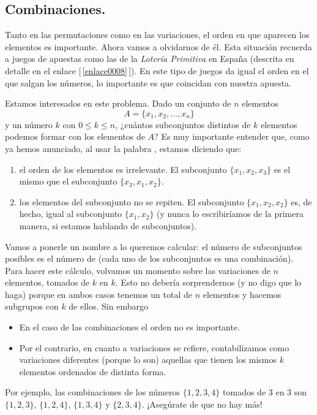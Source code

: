 \subsection{Combinaciones.}
\label{cap03:subsec:Combinaciones}

Tanto en las permutaciones como en las variaciones, el orden en que aparecen los elementos es
importante. Ahora vamos a olvidarnos de \'el. Esta situación recuerda a juegos de apuestas como las de la
{\em Loter\'ia Primitiva} en España (descrita en detalle en el enlace [\,\ref{enlace0008}\,]\label{enlace0008a}). En este tipo de juegos da igual el orden en el que salgan los n\'umeros, lo importante es que coincidan con nuestra apuesta.
	
Estamos interesados en este problema. Dado un conjunto de $n$ elementos
    \[A=\{x_1,x_2,\ldots,x_n\}\]
y un número $k$ con $0\leq k\leq n$, ¿cuántos {\sf subconjuntos distintos} de $k$ elementos podemos formar con los elementos de $A$? Es muy importante entender que, como ya hemos anunciado, al usar la palabra , estamos diciendo que:
    \begin{enumerate}
        \item el {\sf orden de los elementos es irrelevante}. El subconjunto $\{x_1,x_2,x_3\}$ es el mismo que el subconjunto $\{x_3,x_1,x_2\}$.
        \item los elementos del subconjunto {\sf no se repiten}. El subconjunto $\{x_1,x_2,x_2\}$ es, de hecho, igual al subconjunto $\{x_1,x_2\}$ (y nunca lo escribiríamos de la primera manera, si estamos hablando de subconjuntos).
    \end{enumerate}
Vamos a ponerle un nombre a lo queremos calcular: el número de subconjuntos posibles es el número de    (cada uno de los subconjuntos es una combinación). Para hacer este c\'alculo, volvamos un momento sobre las variaciones de $n$ elementos, tomados de $k$ en $k$.
Esto no deber\'ia sorprendernos (y no digo que lo haga) porque en ambos casos tenemos un total de $n$ elementos y hacemos subgrupos con $k$ de ellos. Sin embargo
    \begin{itemize}
    \item En el caso de las combinaciones el orden no es importante.
    \item Por el contrario, en cuanto a variaciones se refiere,
    contabilizamos como variaciones diferentes (porque lo son) aquellas que
    tienen los mismos $k$ elementos ordenados de distinta forma.
    \end{itemize}
Por ejemplo, las combinaciones de los números $\{1, 2, 3, 4\}$ tomados de $3$ en $3$ son $\{1, 2, 3\}$, $\{1, 2, 4\}$, $\{1, 3, 4\}$ y  $\{2, 3, 4\}$. ¡Asegúrate de que no hay más!
 
